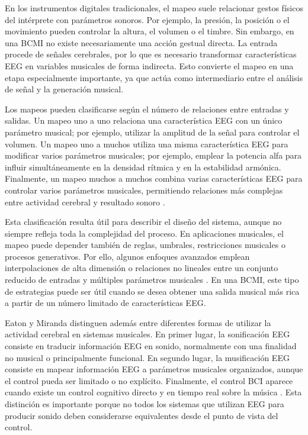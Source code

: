 \documentclass[../main.tex]{subfiles}
\begin{document}
En los instrumentos digitales tradicionales, el mapeo suele relacionar gestos físicos del intérprete con parámetros sonoros. Por ejemplo, la presión, la posición o el movimiento pueden controlar la altura, el volumen o el timbre. Sin embargo, en una BCMI no existe necesariamente una acción gestual directa. La entrada procede de señales cerebrales, por lo que es necesario transformar características EEG en variables musicales de forma indirecta. Esto convierte el mapeo en una etapa especialmente importante, ya que actúa como intermediario entre el análisis de señal y la generación musical.

Los mapeos pueden clasificarse según el número de relaciones entre entradas y salidas. Un mapeo uno a uno relaciona una característica EEG con un único parámetro musical; por ejemplo, utilizar la amplitud de la señal para controlar el volumen. Un mapeo uno a muchos utiliza una misma característica EEG para modificar varios parámetros musicales; por ejemplo, emplear la potencia alfa para influir simultáneamente en la densidad rítmica y en la estabilidad armónica. Finalmente, un mapeo muchos a muchos combina varias características EEG para controlar varios parámetros musicales, permitiendo relaciones más complejas entre actividad cerebral y resultado sonoro \cite{EatonMiranda2014Mapping}.

Esta clasificación resulta útil para describir el diseño del sistema, aunque no siempre refleja toda la complejidad del proceso. En aplicaciones musicales, el mapeo puede depender también de reglas, umbrales, restricciones musicales o procesos generativos. Por ello, algunos enfoques avanzados emplean interpolaciones de alta dimensión o relaciones no lineales entre un conjunto reducido de entradas y múltiples parámetros musicales \cite{EatonMiranda2014Mapping}. En una BCMI, este tipo de estrategias puede ser útil cuando se desea obtener una salida musical más rica a partir de un número limitado de características EEG.

Eaton y Miranda distinguen además entre diferentes formas de utilizar la actividad cerebral en sistemas musicales. En primer lugar, la sonificación EEG consiste en traducir información EEG en sonido, normalmente con una finalidad no musical o principalmente funcional. En segundo lugar, la musificación EEG consiste en mapear información EEG a parámetros musicales organizados, aunque el control pueda ser limitado o no explícito. Finalmente, el control BCI aparece cuando existe un control cognitivo directo y en tiempo real sobre la música \cite{EatonMiranda2014Mapping}. Esta distinción es importante porque no todos los sistemas que utilizan EEG para producir sonido deben considerarse equivalentes desde el punto de vista del control.
\end{document}
